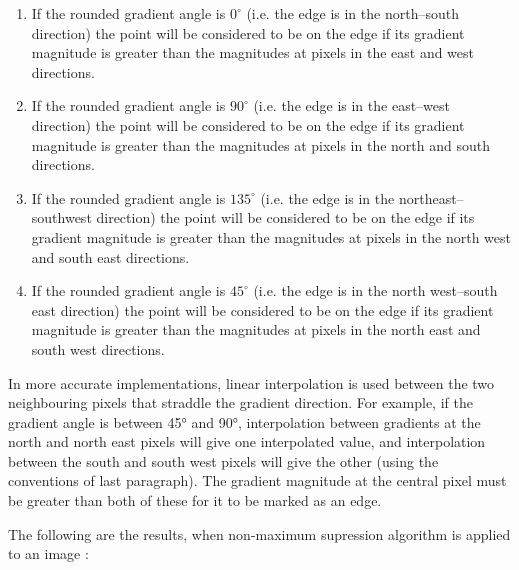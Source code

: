 \documentclass{article}
\begin{document}
		\begin{enumerate}
			\item If the rounded gradient angle is $0^{\circ}$ (i.e. the edge is in the north–south direction) the point will be considered to be on the edge if its gradient magnitude is greater than the magnitudes at pixels in the east and west directions.

			\item If the rounded gradient angle is $90^{\circ}$ (i.e. the edge is in the east–west direction) the point will be considered to be on the edge if its gradient magnitude is greater than the magnitudes at pixels in the north and south directions.

			\item If the rounded gradient angle is $135^{\circ}$ (i.e. the edge is in the northeast–southwest direction) the point will be considered to be on the edge if its gradient magnitude is greater than the magnitudes at pixels in the north west and south east directions.

			\item If the rounded gradient angle is $45^{\circ}$ (i.e. the edge is in the north west–south east direction) the point will be considered to be on the edge if its gradient magnitude is greater than the magnitudes at pixels in the north east and south west directions.
		\end{enumerate}

		In more accurate implementations, linear interpolation is used between the two neighbouring pixels that straddle the gradient direction. For example, if the gradient angle is between 45° and 90°, interpolation between gradients at the north and north east pixels will give one interpolated value, and interpolation between the south and south west pixels will give the other (using the conventions of last paragraph). The gradient magnitude at the central pixel must be greater than both of these for it to be marked as an edge.

		The following are the results, when non-maximum supression algorithm is applied to an image : 
\end{document}
